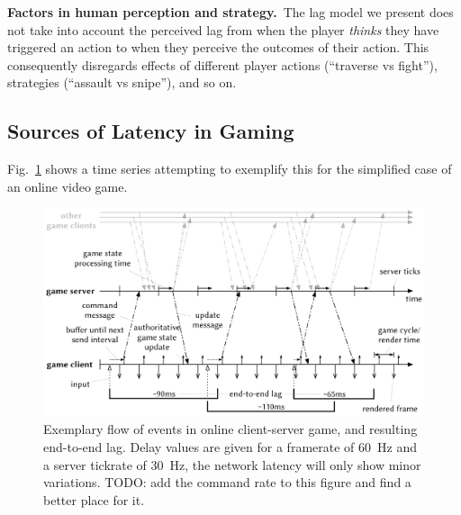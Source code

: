 \textbf{Factors in human perception and strategy.}~The lag model 
we present does not take into account the perceived lag from when the 
player \textit{thinks} they have triggered an action to when they 
perceive the outcomes of their action. This consequently disregards 
effects of different player actions (``traverse vs fight''), strategies 
(``assault vs snipe''), and so on.





\subsection{Sources of Latency in Gaming}
\label{sec:latency}


Fig.~\ref{fig:tickrate-timeseries} shows a time series attempting to exemplify this for the simplified case of an online video game.

\begin{figure}[!t]
	\centering
	\includegraphics[width=1.0\columnwidth]{../models/tickrate-timeseries.pdf}
	\caption{Exemplary flow of events in online client-server game, and resulting end-to-end lag. Delay values are given for a framerate of \SI{60}{\hertz} and a server tickrate of \SI{30}{\hertz}, the network latency will only show minor variations. TODO: add the command rate to this figure and find a better place for it.}
\label{fig:tickrate-timeseries}
\end{figure}






